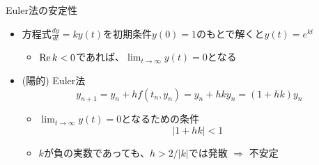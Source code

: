 \begin{frame}[t,fragile]{Euler法の安定性}
  \begin{itemize}
  \item 方程式$\displaystyle \frac{dy}{dt} = k y(t)$を初期条件$y(0)=1$のもとで解くと$y(t)=e^{kt}$
    \begin{itemize}
      \item ${\rm Re}\, k < 0$であれば、$\displaystyle \lim_{t\rightarrow \infty} y(t) = 0$となる
    \end{itemize}
  \item (陽的) Euler法
    \[
    y_{n+1} = y_n + h f(t_n,y_n) = y_n + h k y_n = (1+hk)y_n
    \]
    \begin{itemize}
    \item $\displaystyle \lim_{t\rightarrow \infty} y(t) = 0$となるための条件
      \[
      |  1 + hk | < 1
      \]
    \item $k$が負の実数であっても、$h > 2 / |k|$では発散 $\Rightarrow$ 不安定
    \end{itemize}
  \end{itemize}
\end{frame}
